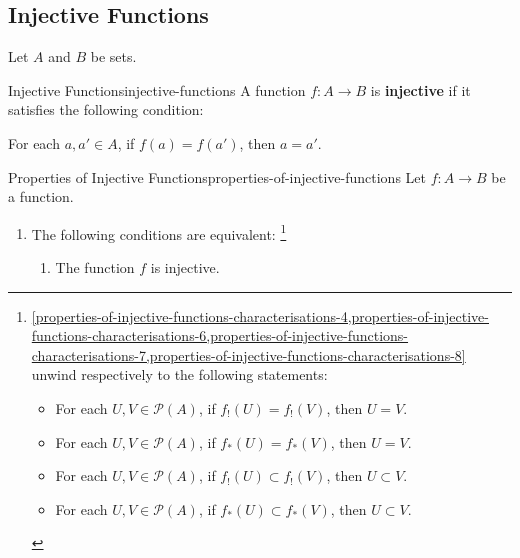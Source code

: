 \subsection{Injective Functions}\label{subsection-injective-functions}
Let $A$ and $B$ be sets.
\begin{definition}{Injective Functions}{injective-functions}%
    A function $f\colon A\to B$ is \textbf{injective} if it satisfies the following condition:
    \begin{itemize}
        \itemstar For each $a,a'\in A$, if $f(a)=f(a')$, then $a=a'$.
    \end{itemize}
\end{definition}
\begin{proposition}{Properties of Injective Functions}{properties-of-injective-functions}%
    Let $f\colon A\to B$ be a function.
    \begin{enumerate}
        \item\label{properties-of-injective-functions-characterisations}The following conditions are equivalent:%
            \footnote{%
                \cref{properties-of-injective-functions-characterisations-4,properties-of-injective-functions-characterisations-6,properties-of-injective-functions-characterisations-7,properties-of-injective-functions-characterisations-8} unwind respectively to the following statements:
                \begin{itemize}
                    \item For each $U,V\in\mathcal{P}(A)$, if $f_{!}(U)=f_{!}(V)$, then $U=V$.%
                    \item For each $U,V\in\mathcal{P}(A)$, if $f_{*}(U)=f_{*}(V)$, then $U=V$.
                    \item For each $U,V\in\mathcal{P}(A)$, if $f_{!}(U)\subset f_{!}(V)$, then $U\subset V$.
                    \item For each $U,V\in\mathcal{P}(A)$, if $f_{*}(U)\subset f_{*}(V)$, then $U\subset V$.
                \end{itemize}
                \par\vspace*{\TCBBoxCorrection}
            }%
            \begin{enumerate}
                \item\label{properties-of-injective-functions-characterisations-1}The function $f$ is injective.

\end{enumerate}
\end{enumerate}
\end{proposition}
